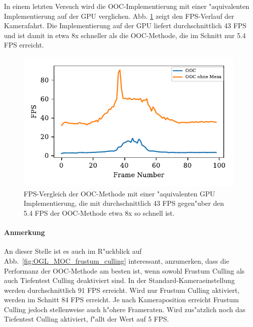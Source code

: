 \documentclass[journal]{vgtc}
\begin{document}
In einem letzten Versuch wird die OOC-Implementierung mit einer "aquivalenten Implementierung auf der GPU verglichen. Abb. \ref{fig:mesa_gpu} zeigt den FPS-Verlauf der Kamerafahrt. Die Implementierung auf der GPU liefert durchschnittlich 43 FPS und ist damit in etwa 8x schneller als die OOC-Methode, die im Schnitt nur 5.4 FPS erreicht.

\begin{figure}
		\includegraphics[width=\columnwidth]{images/Evaluation_6_Results_OOC_Mesa_FPS.pdf}
		\caption{FPS-Vergleich der OOC-Methode mit einer "aquivalenten GPU Implementierung, die mit durchschnittlich 43 FPS gegen"uber den 5.4 FPS der OOC-Methode etwa 8x so schnell ist.}
		\label{fig:mesa_gpu}
\end{figure}

\paragraph{Anmerkung} An dieser Stelle ist es auch im R"uckblick auf Abb.\ \ref{fig:OGL_MOC_frustum_culling} interessant, anzumerken, dass die Performanz der OOC-Methode am besten ist, wenn sowohl Frustum Culling als auch Tiefentest Culling deaktiviert sind. In der Standard-Kameraeinstellung werden durchschnittlich 91 FPS erreicht. Wird nur Frustum Culling aktiviert, werden im Schnitt 84 FPS erreicht.
Je nach Kameraposition erreicht Frustum Culling jedoch stellenweise auch h"ohere Frameraten.
Wird zus"atzlich noch das Tiefentest Culling aktiviert, f"allt der Wert auf 5 FPS.\\
\end{document}
